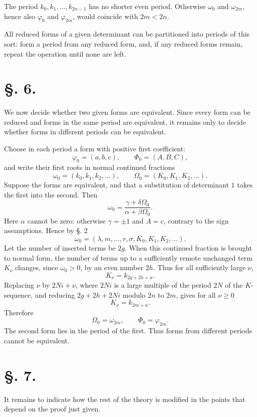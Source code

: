 \documentclass[11pt]{article}
\begin{document}
The period $k_0,k_1,\ldots,k_{2n-1}$ has no shorter even period. Otherwise $\omega_0$ and $\omega_{2m}$, hence also $\varphi_0$ and $\varphi_{2m}$, would coincide with $2m<2n$.

All reduced forms of a given determinant can be partitioned into periods of this sort: form a period from any reduced form, and, if any reduced forms remain, repeat the operation until none are left.

\section*{\S. 6.}

We now decide whether two given forms are equivalent. Since every form can be reduced and forms in the same period are equivalent, it remains only to decide whether forms in different periods can be equivalent.

Choose in each period a form with positive first coefficient:
\[
 \varphi_0=(a,b,c),
 \qquad
 \Phi_0=(A,B,C),
\]
and write their first roots in normal continued fractions
\[
 \omega_0=(k_0,k_1,k_2,\ldots),
 \qquad
 \Omega_0=(K_0,K_1,K_2,\ldots).
\]
Suppose the forms are equivalent, and that a substitution of determinant $1$ takes the first into the second. Then
\[
 \omega_0=\frac{\gamma+\delta\Omega_0}{\alpha+\beta\Omega_0}.
\]
Here $\alpha$ cannot be zero: otherwise $\gamma=\pm1$ and $A=c$, contrary to the sign assumptions. Hence by \S. 2
\[
 \omega_0=(\lambda,m,\ldots,r,\sigma,
 K_0,K_1,K_2,\ldots).
\]
Let the number of inserted terms be $2g$. When this continued fraction is brought to normal form, the number of terms up to a sufficiently remote unchanged term $K_\nu$ changes, since $\omega_0>0$, by an even number $2h$. Thus for all sufficiently large $\nu$,
\[
 K_\nu=k_{2g+2h+
u}.
\]
Replacing $\nu$ by $2Ni+\nu$, where $2Ni$ is a large multiple of the period $2N$ of the $K$-sequence, and reducing $2g+2h+2Ni$ modulo $2n$ to $2m$, gives for all $\nu\ge0$
\[
 K_\nu=k_{2m+
u}.
\]
Therefore
\[
 \Omega_0=\omega_{2m},
 \qquad
 \Phi_0=\varphi_{2m}.
\]
The second form lies in the period of the first. Thus forms from different periods cannot be equivalent.

\section*{\S. 7.}

It remains to indicate how the rest of the theory is modified in the points that depend on the proof just given.
\end{document}

